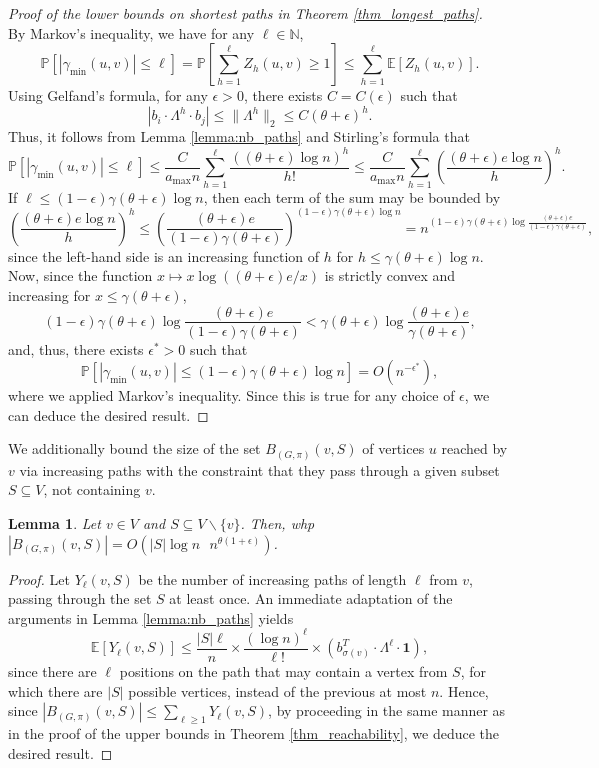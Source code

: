 \documentclass[11pt]{article}
\numberwithin{equation}{section}
\newtheorem{lemma}[theorem]{Lemma}
\theoremstyle{definition}
\newcommand\bE{{\mathbb E}}
\newcommand\bN{{\mathbb N}}
\newcommand\bP{{\mathbb P}}
\begin{document}
\begin{proof}[Proof of the lower bounds on shortest paths in Theorem \ref{thm_longest_paths}]\hfill \\
By Markov's inequality, we have for any $\ell \in \bN$,
$$ \bP[|\gamma_{\min}(u,v)| \leq \ell] = \bP\left[\sum_{h=1}^\ell Z_h(u,v) \geq 1 \right] \leq \sum_{h=1}^\ell \bE[Z_h(u,v)].$$
Using Gelfand's formula, for any $\epsilon > 0$, there exists $C=C(\epsilon)$ such that
$$ |b_i \cdot \Lambda^h \cdot b_j |\leq \|\Lambda^h\|_2 \leq C (\theta + \epsilon)^h.$$
Thus, it follows from Lemma \ref{lemma:nb_paths} and Stirling's formula that
$$ \bP[|\gamma_{\min}(u,v)| \leq \ell] \leq \frac{C}{a_{\max} n} \sum_{h=1}^{\ell} \frac{((\theta+\epsilon)\log n)^h}{h!} \leq \frac{C}{a_{\max} n} \sum_{h=1}^{\ell} \left(\frac{(\theta+\epsilon)e\log n}{h}\right)^h.$$
If $\ell \leq (1-\epsilon)\gamma(\theta+\epsilon)\log n$, then each term of the sum may be bounded by
$$ \left(\frac{(\theta+\epsilon)e\log n}{h}\right)^h \leq \left(\frac{(\theta+\epsilon)e}{(1-\epsilon)\gamma(\theta+\epsilon)}\right)^{(1-\epsilon)\gamma(\theta+\epsilon)\log n} = n^{(1-\epsilon)\gamma(\theta+\epsilon)\log\frac{(\theta+\epsilon)e}{(1-\epsilon)\gamma(\theta+\epsilon)}},$$
since the left-hand side is an increasing function of $h$ for $h \leq \gamma(\theta+\epsilon)\log n$. Now, since the function $x\mapsto x\log((\theta+\epsilon)e/x)$ is strictly convex and increasing for $x \leq \gamma(\theta+\epsilon)$, 
$$ (1-\epsilon)\gamma(\theta+\epsilon)\log\frac{(\theta+\epsilon)e}{(1-\epsilon)\gamma(\theta+\epsilon)} < \gamma(\theta+\epsilon)\log\frac{(\theta+\epsilon)e}{\gamma(\theta+\epsilon)},$$
and, thus, there exists $\epsilon^* > 0$ such that 
$$ \bP[|\gamma_{\min}(u,v)| \leq (1-\epsilon)\gamma(\theta+\epsilon)\log n] = O(n^{-\epsilon^*}),$$
where we applied Markov's inequality. Since this is true for any choice of $\epsilon$, we can deduce the desired result.
\end{proof}

We additionally bound the size of the set $B_{(G,\pi)}(v,S)$ of vertices $u$ reached by $v$ via increasing paths with the constraint that they pass through a given subset $S\subseteq V$, not containing $v$. 
\begin{lemma}
\label{upper:S}
Let $v\in V$ and $S\subseteq V\backslash \{v\}$. Then, whp $|B_{(G,\pi)}(v,S)| = O(|S|\log n \textrm{ }n^{\theta(1+\epsilon)})$.  
\end{lemma}
\begin{proof}
Let $Y_\ell(v,S)$ be the number of increasing paths of length $\ell$ from $v$, passing through the set $S$ at least once. An immediate adaptation of the arguments in Lemma \ref{lemma:nb_paths} yields
$$ \bE[Y_\ell(v,S)] \leq \frac{|S|\ell}{n} \times \frac{(\log n)^\ell }{\ell!} \times (b_{\sigma(v)}^T \cdot \Lambda^\ell \cdot \boldsymbol{1}),$$
since there are $\ell$ positions on the path that may contain a vertex from $S$, for which there are $|S|$ possible vertices, instead of the previous at most $n$. Hence, since $|B_{(G,\pi)}(v,S)| \leq \sum_{\ell \geq 1} Y_\ell(v,S)$, by proceeding in the same manner as in the proof of the upper bounds in Theorem \ref{thm_reachability}, we deduce the desired result.
\end{proof}
\end{document}
